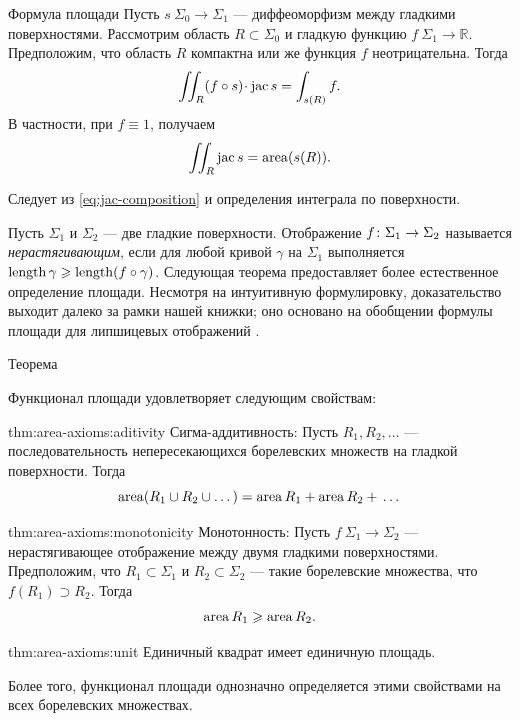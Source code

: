 \begin{thm}{Формула площади}\label{prop:surface-integral}
Пусть $s\:\Sigma_0\to \Sigma_1$ --- диффеоморфизм между гладкими поверхностями.
Рассмотрим область $R\subset \Sigma_0$ и гладкую функцию $f\:\Sigma_1\to\mathbb{R}$.
Предположим, что область $R$ компактна или же функция $f$ неотрицательна.
Тогда 
\[\iint_R (f\circ s)\cdot \jac s=\int_{s(R)}f.\]
В частности, при $f\equiv 1$, получаем
\[\iint_R \mathop{\rm jac}\nolimits s=\mathop{\rm area}\nolimits (s(R)).\]
\end{thm}

Следует из \ref{eq:jac-composition} и определения интеграла по поверхности.
\qeds


Пусть $\Sigma_1$ и $\Sigma_2$ --- две гладкие поверхности.
Отображение $f\:\Sigma_1\z\to \Sigma_2$ называется \emph{нерастягивающим}, если для любой кривой $\gamma$ на $\Sigma_1$ выполняется $\mathop{\rm length}\nolimits\gamma\geqslant \mathop{\rm length}\nolimits (f\circ\gamma)$.
Следующая теорема предоставляет более естественное определение площади.
Несмотря на интуитивную формулировку, доказательство выходит далеко за рамки нашей книжки;
оно основано на обобщении формулы площади для липшицевых отображений \cite[3.2.3]{federer}.


\begin{thm}{Теорема}\label{thm:area-axioms}
{\sloppy
Функционал площади удовлетворяет следующим свойствам:

}

\begin{subthm}{thm:area-axioms:aditivity}
Сигма-аддитивность: 
Пусть $R_1,R_2,\dots$ --- последовательность непересекающихся борелевских множеств на гладкой поверхности.
Тогда 
\[\mathop{\rm area}\nolimits (R_1\cup R_2\cup \dots)=\mathop{\rm area}\nolimits R_1+\mathop{\rm area}\nolimits R_2+{}\dots\]
\end{subthm}

{\sloppy

\begin{subthm}{thm:area-axioms:monotonicity}
Монотонность:
Пусть $f\:\Sigma_1\to \Sigma_2$ --- нерастягивающее отображение между двумя гладкими поверхностями.
Предположим, что $R_1\subset \Sigma_1$ и $R_2\subset \Sigma_2$ --- такие борелевские множества, что $f(R_1)\supset R_2$.
Тогда 
\[\mathop{\rm area}\nolimits R_1\geqslant \mathop{\rm area}\nolimits R_2.\]
\end{subthm}

}

\begin{subthm}{thm:area-axioms:unit}
Единичный квадрат имеет единичную площадь. 
\end{subthm}

Более того, функционал площади однозначно определяется этими свойствами на всех борелевских множествах.
\end{thm}

